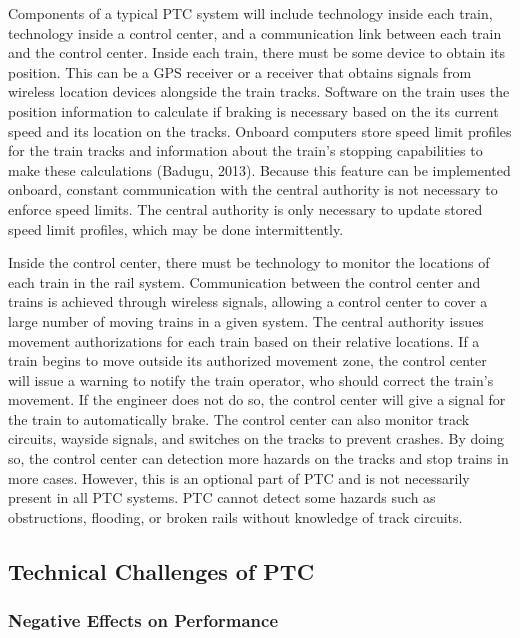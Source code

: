 \documentclass[11pt, titlepage]{article}
\begin{document}
Components of a typical PTC system will include technology inside each train, technology inside a control center, and a communication link between each train and the control center. Inside each train, there must be some device to obtain its position. This can be a GPS receiver or a receiver that obtains signals from wireless location devices alongside the train tracks. Software on the train uses the position information to calculate if braking is necessary based on the its current speed and its location on the tracks. Onboard computers store speed limit profiles for the train tracks and information about the train’s stopping capabilities to make these calculations (Badugu, 2013). Because this feature can be implemented onboard, constant communication with the central authority is not necessary to enforce speed limits. The central authority is only necessary to update stored speed limit profiles, which may be done intermittently.

Inside the control center, there must be technology to monitor the locations of each train in the rail system. Communication between the control center and trains is achieved through wireless signals, allowing a control center to cover a large number of moving trains in a given system. The central authority issues movement authorizations for each train based on their relative locations. If a train begins to move outside its authorized movement zone, the control center will issue a warning to notify the train operator, who should correct the train’s movement. If the engineer does not do so, the control center will give a signal for the train to automatically brake. The control center can also monitor track circuits, wayside signals, and switches on the tracks to prevent crashes. By doing so, the control center can detection more hazards on the tracks and stop trains in more cases. However, this is an optional part of PTC and is not necessarily present in all PTC systems. PTC cannot detect some hazards such as obstructions, flooding, or broken rails without knowledge of track circuits.

\subsection{Technical Challenges of PTC}

\subsubsection{Negative Effects on Performance}
\end{document}
